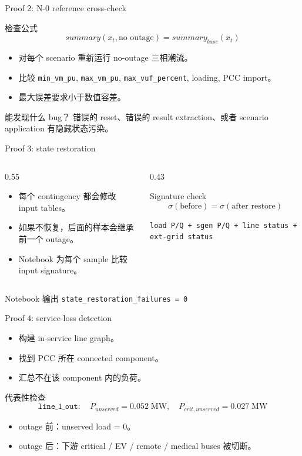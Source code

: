 \documentclass[aspectratio=169,11pt]{beamer}
\begin{document}
\begin{frame}{Proof 2: N-0 reference cross-check}
\begin{block}{检查公式}
\[
summary(x_t,\text{no outage})=summary_{base}(x_t)
\]
\end{block}
\begin{itemize}
  \item 对每个 scenario 重新运行 no-outage 三相潮流。
  \item 比较 \texttt{min\_vm\_pu}, \texttt{max\_vm\_pu}, \texttt{max\_vuf\_percent}, loading, PCC import。
  \item 最大误差要求小于数值容差。
\end{itemize}
\begin{alertblock}{能发现什么 bug？}
错误的 reset、错误的 result extraction、或者 scenario application 有隐藏状态污染。
\end{alertblock}
\end{frame}

\begin{frame}{Proof 3: state restoration}
\begin{columns}
\begin{column}{0.55\textwidth}
\begin{itemize}
  \item 每个 contingency 都会修改 input tables。
  \item 如果不恢复，后面的样本会继承前一个 outage。
  \item Notebook 为每个 sample 比较 input signature。
\end{itemize}
\end{column}
\begin{column}{0.43\textwidth}
\begin{block}{Signature check}
\[
\sigma(\text{before})=\sigma(\text{after restore})
\]
\end{block}
\small
\texttt{load P/Q + sgen P/Q + line status + ext-grid status}
\end{column}
\end{columns}
\begin{exampleblock}{Notebook 输出}
\texttt{state\_restoration\_failures = 0}
\end{exampleblock}
\end{frame}

\begin{frame}{Proof 4: service-loss detection}
\begin{itemize}
  \item 构建 in-service line graph。
  \item 找到 PCC 所在 connected component。
  \item 汇总不在该 component 内的负荷。
\end{itemize}
\begin{block}{代表性检查}
\[
\texttt{line\_1\_out}:\quad P_{unserved}=0.052\;\mathrm{MW},\quad P_{crit,unserved}=0.027\;\mathrm{MW}
\]
\end{block}
\begin{itemize}
  \item outage 前：unserved load = 0。
  \item outage 后：下游 critical / EV / remote / medical buses 被切断。
\end{itemize}
\end{frame}
\end{document}
